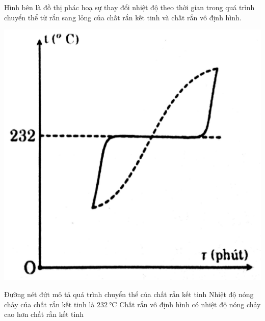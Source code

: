 \begin{ex}
	Hình bên là đồ thị phác hoạ sự thay đổi nhiệt độ theo thời gian trong quá trình chuyển thể từ rắn sang lỏng của chất rắn kết tinh và chất rắn vô định hình.
\begin{center}
	\includegraphics[width=0.3\linewidth]{figs/G12-BT1+2-4}
\end{center}
	{Đường nét đứt mô tả quá trình chuyển thể của chất rắn kết tinh}
	{\True Nhiệt độ nóng chảy của chất rắn kết tinh là $\SI{232}{\celsius}$}
	{Chất rắn vô định hình có nhiệt độ nóng chảy cao hơn chất rắn kết tinh}
	\loigiai{}
\end{ex}

